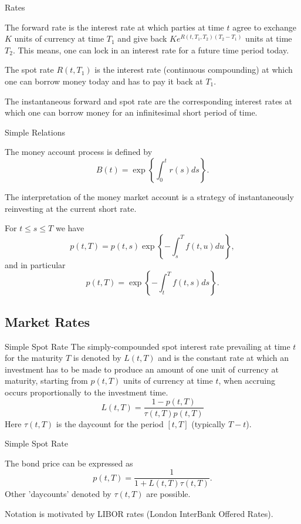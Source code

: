 {Rates}
\item<1-> The forward rate is the interest rate at which parties
at time $t$ agree to exchange $K$ units of currency at time $T_1$
and give back $Ke^{R(t,T_1,T_2)(T_2-T_1)}$ units at time $T_2$.
This means, one can lock in an interest rate for a future time
period today. \item<2->The spot rate $R(t,T_1)$ is the interest
rate (continuous compounding) at which one can borrow money today
and has to pay it back at $T_1$. \item<3->The instantaneous
forward and spot rate are the corresponding interest rates at
which one can borrow money for an infinitesimal short period of
time.

{Simple Relations}

The money account process is defined by
$$
B(t) = \exp\left\{ \int_0^t r(s) ds\right\}\!.
$$

The interpretation of the money market account is a strategy of
instantaneously reinvesting at the current short rate.

For $t \leq s \leq T$ we have
$$
p(t,T) = p(t,s) \exp\left\{-\int_s^T f(t,u) du\right\}\!,
$$
and in particular
$$
p(t,T) = \exp\left\{-\int_t^T f(t,s) ds\right\}\!.
$$

\subsection{Market Rates}

{Simple Spot Rate}
The simply-compounded spot interest rate prevailing at time $t$ for
the maturity $T$ is denoted by $L(t,T)$ and is the constant rate
at which an investment has to be made to produce an amount of one
unit of currency at maturity, starting from $p(t,T)$ units of
currency at time $t$, when accruing occurs proportionally to the
investment time.
\begin{equation}\label{LIBOR-spot}
L(t,T)=\frac{1-p(t,T)}{\tau(t,T)p(t,T)}
\end{equation}
Here $\tau(t,T)$ is the
daycount for the period $[t,T]$ (typically $T-t$).

{Simple Spot Rate}
\item<1-> The bond price can be expressed as
$$
p(t,T)=\frac{1}{1+L(t,T)\tau(t,T)}.
$$
Other 'daycounts' denoted  by $\tau(t,T)$ are possible.
\item<2-> Notation is motivated by LIBOR rates (London InterBank Offered
Rates).

